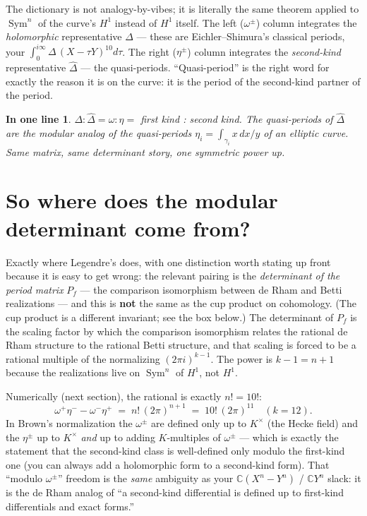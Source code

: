\documentclass[11pt]{article}
\newcommand{\CC}{\mathbb{C}}
\newcommand{\Dhat}{\widehat{\Delta}}
\DeclareMathOperator{\Sym}{Sym}
\newtheorem*{slogan}{In one line}
\begin{document}
The dictionary is not analogy-by-vibes; it is literally the same theorem
applied to $\Sym^n$ of the curve's $H^1$ instead of $H^1$ itself. The
left ($\omega^\pm$) column integrates the \emph{holomorphic} representative
$\Delta$ --- these are Eichler--Shimura's classical periods, your
$\int_0^{i\infty}\Delta\,(X-\tau Y)^{10}d\tau$. The right ($\eta^\pm$)
column integrates the \emph{second-kind} representative $\Dhat$ --- the
quasi-periods. ``Quasi-period'' is the right word for exactly the reason
it is on the curve: it is the period of the second-kind partner of the
period.

\begin{slogan}
$\Delta : \Dhat = \omega : \eta = $ first kind : second kind. The
quasi-periods of $\Dhat$ are the modular analog of the quasi-periods
$\eta_i = \int_{\gamma_i} x\,dx/y$ of an elliptic curve. Same matrix, same
determinant story, one symmetric power up.
\end{slogan}

\section{So where does the modular determinant come from?}

Exactly where Legendre's does, with one distinction worth stating up
front because it is easy to get wrong: the relevant pairing is the
\emph{determinant of the period matrix} $P_f$ --- the comparison
isomorphism between de Rham and Betti realizations --- and this is
\textbf{not} the same as the cup product on cohomology. (The cup product
is a different invariant; see the box below.) The determinant of $P_f$
is the scaling factor by which the comparison isomorphism relates the
rational de Rham structure to the rational Betti structure, and that
scaling is forced to be a rational multiple of the normalizing
$(2\pi i)^{k-1}$. The power is $k-1 = n+1$ because the realizations live
on $\Sym^n$ of $H^1$, not $H^1$.

Numerically (next section), the rational is exactly $n! = 10!$:
\[
  \omega^+\eta^- - \omega^-\eta^+ \;=\; n!\,(2\pi)^{n+1}
  \;=\; 10!\,(2\pi)^{11}\quad(k=12).
\]
In Brown's normalization the $\omega^\pm$ are defined
only up to $K^\times$ (the Hecke field) and the $\eta^\pm$ up to $K^\times$
\emph{and} up to adding $K$-multiples of $\omega^\pm$ --- which is exactly
the statement that the second-kind class is well-defined only modulo the
first-kind one (you can always add a holomorphic form to a second-kind
form). That ``modulo $\omega^\pm$'' freedom is the \emph{same} ambiguity as
your $\CC(X^n - Y^n)$ / $\CC Y^n$ slack: it is the de Rham analog of ``a
second-kind differential is defined up to first-kind differentials and
exact forms.''
\end{document}
